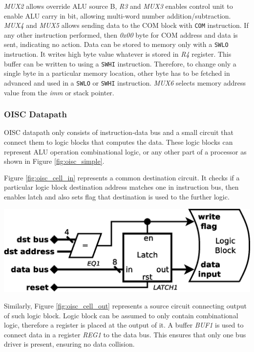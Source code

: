 \textit{MUX2} allows override ALU source B, \textit{R3} and \textit{MUX3} enables control unit to enable ALU carry in bit, allowing multi-word number addition/subtraction. \textit{MUX4} and \textit{MUX5} allows sending data to the COM block with \texttt{COM} instruction. If any other instruction performed, then \textit{0x00} byte for COM address and data is sent, indicating no action. Data can be stored to memory only with a \texttt{SWLO} instruction. It writes high byte value whatever is stored in \textit{R4} register. This buffer can be written to using a \texttt{SWHI} instruction. Therefore, to change only a single byte in a particular memory location, other byte has to be fetched in advanced and used in a \texttt{SWLO} or \texttt{SWHI} instruction. \textit{MUX6} selects memory address value from the \textit{imm} or stack pointer.

\subsubsection{OISC Datapath} \label{subsec:oisc_cells}
OISC datapath only consists of instruction-data bus and a small circuit that connect them to logic blocks that computes the data. These logic blocks can represent ALU operation combinational logic, or any other part of a processor as shown in Figure \ref{fig:oisc_simple}.

Figure \ref{fig:oisc_cell_in} represents a common destination circuit. It checks if a particular logic block destination address matches one in instruction bus, then enables latch and also sets flag that destination is used to the further logic. 
\begin{colfigure}
	\centering
	\includegraphics[width=\linewidth]{../resources/oisc_cell_in.eps}
	\label{fig:oisc_cell_in}
\end{colfigure}

Similarly, Figure \ref{fig:oisc_cell_out} represents a source circuit connecting output of such logic block. Logic block can be assumed to only contain combinational logic, therefore a register is placed at the output of it. A buffer \textit{BUF1} is used to connect data in a register \textit{REG1} to the data bus. This ensures that only one bus driver is present, ensuring no data collision. 

